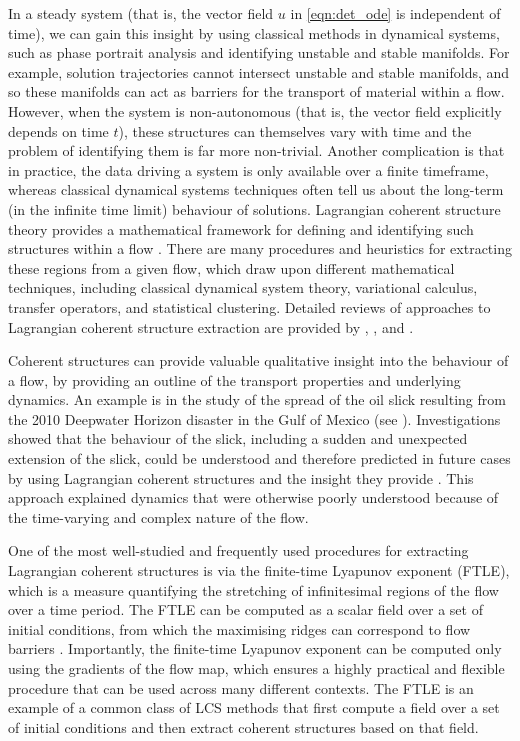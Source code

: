 In a steady system (that is, the vector field \(u\) in \cref{eqn:det_ode} is independent of time), we can gain this insight by using classical methods in dynamical systems, such as phase portrait analysis and identifying unstable and stable manifolds.
For example, solution trajectories cannot intersect unstable and stable manifolds, and so these manifolds can act as barriers for the transport of material within a flow.
However, when the system is non-autonomous (that is, the vector field explicitly depends on time \(t\)), these structures can themselves vary with time and the problem of identifying them is far more non-trivial.
Another complication is that in practice, the data driving a system is only available over a finite timeframe, whereas classical dynamical systems techniques often tell us about the long-term (in the infinite time limit) behaviour of solutions.
Lagrangian coherent structure theory provides a mathematical framework for defining and identifying such structures within a flow \citep{BalasuriyaEtAl_2018_GeneralizedLagrangianCoherent}.
There are many procedures and heuristics for extracting these regions from a given flow, which draw upon different mathematical techniques, including classical dynamical system theory, variational calculus, transfer operators, and statistical clustering.
Detailed reviews of approaches to Lagrangian coherent structure extraction are provided by \citet{PeacockDabiri_2010_IntroductionFocusIssue}, \citet{HadjighasemEtAl_2017_CriticalComparisonLagrangian}, and \citet{BalasuriyaEtAl_2018_GeneralizedLagrangianCoherent}.

Coherent structures can provide valuable qualitative insight into the behaviour of a flow, by providing an outline of the transport properties and underlying dynamics.
An example is in the study of the spread of the oil slick resulting from the 2010 Deepwater Horizon disaster in the Gulf of Mexico (see ).
Investigations showed that the behaviour of the slick, including a sudden and unexpected extension of the slick, could be understood and therefore predicted in future cases by using Lagrangian coherent structures and the insight they provide \citep{OlascoagaEtAl_2013_DrifterMotionGulf,OlascoagaHaller_2012_ForecastingSuddenChanges,MezicEtAl_2010_NewMixingDiagnostic}.
This approach explained dynamics that were otherwise poorly understood because of the time-varying and complex nature of the flow.

One of the most well-studied and frequently used procedures for extracting Lagrangian coherent structures is via the finite-time Lyapunov exponent (FTLE), which is a measure quantifying the stretching of infinitesimal regions of the flow over a time period.
The FTLE can be computed as a scalar field over a set of initial conditions, from which the maximising ridges can correspond to flow barriers \citep{ShaddenEtAl_2005_DefinitionPropertiesLagrangian}.
Importantly, the finite-time Lyapunov exponent can be computed only using the gradients of the flow map, which ensures a highly practical and flexible procedure that can be used across many different contexts.
The FTLE is an example of a common class of LCS methods that first compute a field over a set of initial conditions and then extract coherent structures based on that field.

